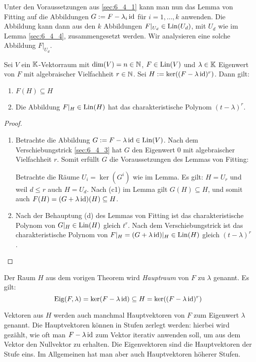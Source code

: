 Unter den Voraussetzungen aus \ref{sec:6_4_1} kann man nun das Lemma von Fitting auf die Abbildungen $ G := F - \lambda_i \operatorname{id} $ für $ i = 1, \ldots, k $ anwenden. Die Abbildung kann dann aus den $k$ Abbildungen $ F|_{U_d} \in \operatorname{Lin}(U_d) $, mit $ U_d $ wie im Lemma \ref*{sec:6_4_4}, zusammengesetzt werden. Wir analysieren eine solche Abbildung $ F|_{U_d} $.

\begin{thm}
	Sei $ V $ ein $ \mathbb K $-Vektorraum mit $ \dim(V) = n \in \mathbb N $, $ F \in \operatorname{Lin}(V) $ und $ \lambda \in \mathbb K $ Eigenwert von $ F $ mit algebraischer Vielfachheit $ r \in \mathbb N $. Sei $ H := \ker((F-\lambda \operatorname{id})^r) $. Dann gilt:
	\begin{enumerate}
		\item
			$ F(H) \subseteq H $
		\item
			Die Abbildung $ F|_H \in \operatorname{Lin}(H) $ hat das charakteristische Polynom $ (t-\lambda)^r $.
	\end{enumerate}
\end{thm}
\begin{proof}\
	\begin{enumerate}
		\item
			Betrachte die Abbildung $ G := F - \lambda\operatorname{id} \in \operatorname{Lin}(V) $. Nach dem Verschiebungstrick \ref{sec:6_4_3} hat $ G $ den Eigenwert 0 mit algebraischer Vielfachheit $ r $. Somit erfüllt $ G $ die Voraussetzungen des Lemmas von Fitting:
			
			Betrachte die Räume $ U_i = \ker(G^i) $ wie im Lemma. Es gilt: $ H = U_r $ und weil $ d \leq r $ auch $ H = U_d $. Nach (c1) im Lemma gilt $ G(H) \subseteq H $, und somit auch $ F(H) = (G + \lambda\operatorname{id})(H) \subseteq H $.
		\item
			Nach der Behauptung (d) des Lemmas von Fitting ist das charakteristische Polynom von $ G|_H \in \operatorname{Lin}(H) $ gleich $ t^r $. Nach dem Verschiebungstrick ist das charakteristische Polynom von $ F|_H = (G+\lambda\operatorname{id})|_H \in \operatorname{Lin}(H) $ gleich $ (t - \lambda)^r $. \qedhere
	\end{enumerate}
\end{proof}

\noindent Der Raum $ H $ aus dem vorigen Theorem wird \emph{Hauptraum} von $ F $ zu $ \lambda $ genannt. Es gilt:
\begin{equation}
	\operatorname{Eig}(F,\lambda) = \ker(F - \lambda\operatorname{id}) \subseteq H = \ker((F - \lambda\operatorname{id})^r)
\end{equation}

Vektoren aus $H$ werden auch manchmal Hauptvektoren von $F$ zum Eigenwert $\lambda$ genannt. Die Hauptvektoren können in Stufen zerlegt werden: hierbei wird gezählt, wie oft man $ F - \lambda \operatorname{id}$ zum Vektor iterativ anwenden soll, um aus dem Vektor den Nullvektor zu erhalten. Die Eigenvektoren sind die Hauptvektoren der Stufe eins. Im Allgemeinen hat man aber auch Hauptvektoren höherer Stufen. 

